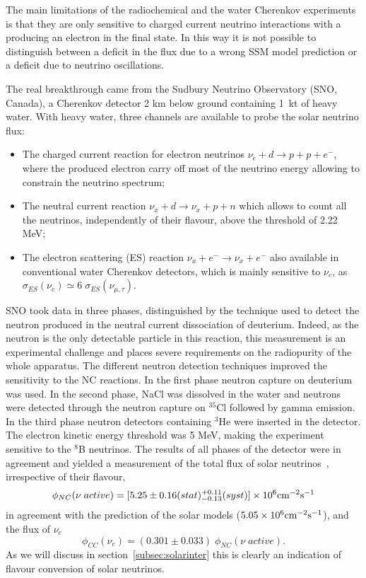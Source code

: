 The main limitations of the radiochemical and the water Cherenkov experiments is that they are only sensitive to charged current neutrino interactions with a \nue producing an electron in the final state. In this way it is not possible to distinguish between a deficit in the \nue flux due to a wrong SSM model prediction or a deficit due to neutrino oscillations.

The real breakthrough came from the Sudbury Neutrino Observatory (SNO, Canada), a Cherenkov detector 2 km below ground containing 1~kt of heavy water. 
With heavy water, three channels are available to probe the solar neutrino flux: 
\begin{itemize}
\item The charged current reaction for electron neutrinos $ \nu_e + d \rightarrow p + p + e^-$, where the produced electron carry off most of the neutrino energy allowing to constrain the neutrino spectrum;
\item The neutral current reaction $ \nu_x + d \rightarrow \nu_x +  p + n $ which allows to count all the neutrinos, independently of their flavour, above the threshold of 2.22 MeV; 
\item The electron scattering (ES) reaction $ \nu_x + e^- \rightarrow \nu_x + e^-$ also available in conventional water Cherenkov detectors, which is mainly sensitive to $ \nu_e$, as $\sigma_{ES}(\nu_e)\simeq 6 \; \sigma_{ES}(\nu_{\mu, \tau})$. 
\end{itemize}
SNO took data in three phases, distinguished by the technique used to detect the neutron produced in the neutral current dissociation of deuterium. Indeed, as the neutron is the only detectable particle in this reaction, this measurement is an experimental challenge and places severe requirements on the radiopurity of the whole apparatus. The different neutron detection techniques improved the sensitivity to the NC reactions. In the first phase neutron capture on deuterium was used. In the second phase, NaCl was dissolved in the water and neutrons were detected through the neutron capture on $^{35}$Cl followed by gamma emission. In the third phase neutron detectors containing $^3$He were inserted in the detector.
The electron kinetic energy threshold was 5 MeV, making the experiment sensitive to the ${}^8$B neutrinos. 
The results of all phases of the detector were in agreement and yielded a measurement of the total flux of solar neutrinos~\cite{aharmim}, irrespective of their flavour,
\begin{equation}
\phi_{NC} (\nu \; active ) = [5.25 \pm 0.16 (stat) ^{+0.11}
_{-0.13} (syst)] \times 10^6 {\rm cm^{-2} s^{-1}} 
\end{equation}
in agreement with the prediction of the solar models ($5.05 \times 10^6 {\rm cm^{-2} s^{-1}}$), and the flux of $\nu_e$
\begin{equation}
\phi_{CC} (\nu_e ) =  (0.301 \pm 0.033) \; \phi_{NC} (\nu \; active ).
\end{equation}
As we will discuss in section~\ref{subsec:solarinter} this is clearly an indication of flavour conversion of solar neutrinos. 

